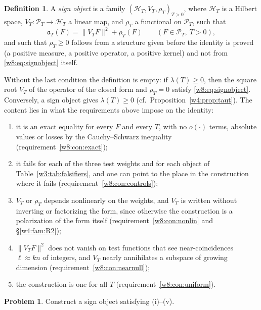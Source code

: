 \documentclass[11pt]{amsart}
\theoremstyle{definition}
\newtheorem{definition}[theorem]{Definition}
\newtheorem{problem}[theorem]{Problem}
\theoremstyle{remark}
\numberwithin{equation}{section}
\newcommand{\PT}{\mathcal{P}_T}                        %
\newcommand{\aT}{\mathfrak{a}_T}                       %
\newcommand{\lam}{\lambda(T)}                          %
\begin{document}
\begin{definition}\label{w8:def:signobject}
A \emph{sign object} is a family $(\mathcal H_T,V_T,\rho_T)_{T>0}$, where $\mathcal H_T$ is a Hilbert space,
$V_T:\PT\to\mathcal H_T$ a linear map, and $\rho_T$ a functional on $\PT$, such that
\begin{equation}\label{w8:eq:signobject}
\aT(F)=\|V_TF\|^2+\rho_T(F)\qquad(F\in\PT,\ T>0),
\end{equation}
and such that $\rho_T\ge0$ follows from a structure given before the identity is proved (a positive measure, a
positive operator, a positive kernel) and not from \eqref{w8:eq:signobject} itself.
\end{definition}

Without the last condition the definition is empty: if $\lam\ge0$, then the square root $V_T$ of the operator of
the closed form and $\rho_T=0$ satisfy \eqref{w8:eq:signobject}. Conversely, a sign object gives $\lam\ge0$
(cf.\ Proposition~\ref{w4:prop:taut}). The content lies in what the requirements above impose on the identity:
\begin{enumerate}[label=(\roman*)]
\item it is an exact equality for every $F$ and every $T$, with no $o(\cdot)$ terms, absolute values or losses by
the Cauchy--Schwarz inequality (requirement~\ref{w8:con:exact});
\item it fails for each of the three test weights and for each object of Table~\ref{w3:tab:falsifiers}, and one
can point to the place in the construction where it fails (requirement~\ref{w8:con:controls});
\item $V_T$ or $\rho_T$ depends nonlinearly on the weights, and $V_T$ is written without inverting or factorizing
the form, since otherwise the construction is a polarization of the form itself (requirement~\ref{w8:con:nonlin} and \S\ref{w4:fam:R2});
\item $\|V_TF\|^2$ does not vanish on test functions that see near-coincidences $\ell\approx kn$ of integers,
and $V_T$ nearly annihilates a subspace of growing dimension (requirement~\ref{w8:con:nearnull});
\item the construction is one for all $T$ (requirement~\ref{w8:con:uniform}).
\end{enumerate}

\begin{problem}\label{w8:prob:signobject}
Construct a sign object satisfying (i)--(v).
\end{problem}
\end{document}
